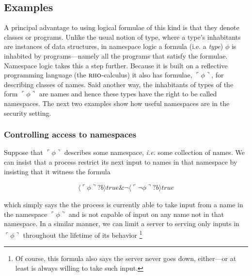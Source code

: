 \documentclass[]{acm_proc_article-sp}
\newcommand{\lpquote}{\ulcorner}
\newcommand{\rpquote}{\urcorner}
\newcommand{\ptrue}{\mathbin{true}}
\newcommand{\pquotep}[1]{\lpquote #1 \rpquote}
\newcommand{\pprefix}[3]{\langle #1 ? #2 \rangle #3}
\numberwithin{equation}{subsection}
\newcommand{\pic}{$\pi$-calculus}
\newcommand{\rhoc}{${\textsc{rho}}$-calculus}
\begin{document}

\subsection{Examples}

A principal advantage to using logical formulae of this kind is that
they denote classes or programs. Unlike the usual notion of type,
where a type's inhabitants are instances of data structures, in
namespace logic a formula (i.e. a \emph{type}) $\phi$ is inhabited by
programs---namely all the programs that satisfy the
formulae. Namespace logic takes this a step further. Because it is
built on a reflective programming language (the \rhoc) it also has
formulae, $\pquotep{\phi}$, for describing classes of names. Said
another way, the inhabitants of types of the form $\pquotep{\phi}$ are
names and hence these types have the right to be called
namespaces. The next two examples show how useful namespaces are in
the security setting.

\subsubsection{Controlling access to namespaces}
\label{namespace}
Suppose that $\pquotep{\phi}$ describes some namespace, {\em i.e.} some
collection of names. We can insist that a process restrict its next
input to names in that namespace by insisting that it witness the formula

\begin{eqnarray}
  \pprefix{\pquotep{\phi}}{b}{\ptrue} \& \neg \pprefix{\pquotep{\neg \phi}}{b}{\ptrue} \nonumber
\end{eqnarray}

\noindent which simply says the the process is currently able to take input from
a name in the namespace $\pquotep{\phi}$ and is not capable of input on
any name not in that namespace. In a similar manner, we can limit a
server to serving only inputs in $\pquotep{\phi}$ throughout the
lifetime of its behavior \footnote{Of course, this formula also says
the server never goes down, either---or at least is always willing
to take such input.}
\end{document}
